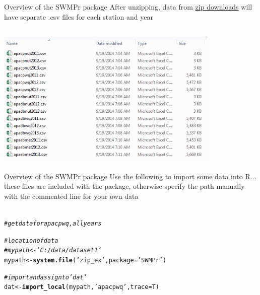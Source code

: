 \documentclass[xcolor=svgnames]{beamer}\usepackage[]{graphicx}\usepackage[]{color}
\makeatletter
\newcommand{\hlstr}[1]{\textcolor[rgb]{0.192,0.494,0.8}{#1}}%
\newcommand{\hlcom}[1]{\textcolor[rgb]{0.678,0.584,0.686}{\textit{#1}}}%
\newcommand{\hlstd}[1]{\textcolor[rgb]{0.345,0.345,0.345}{#1}}%
\newcommand{\hlkwb}[1]{\textcolor[rgb]{0.69,0.353,0.396}{#1}}%
\newcommand{\hlkwc}[1]{\textcolor[rgb]{0.333,0.667,0.333}{#1}}%
\newcommand{\hlkwd}[1]{\textcolor[rgb]{0.737,0.353,0.396}{\textbf{#1}}}%
\newenvironment{kframe}{%
 \def\at@end@of@kframe{}%
 \ifinner\ifhmode%
  \def\at@end@of@kframe{\end{minipage}}%
  \begin{minipage}{\columnwidth}%
 \fi\fi%
 \def\FrameCommand##1{\hskip\@totalleftmargin \hskip-\fboxsep
 \colorbox{shadecolor}{##1}\hskip-\fboxsep
     \hskip-\linewidth \hskip-\@totalleftmargin \hskip\columnwidth}%
 \MakeFramed {\advance\hsize-\width
   \@totalleftmargin\z@ \linewidth\hsize
   \@setminipage}}%
 {\par\unskip\endMakeFramed%
 \at@end@of@kframe}
\newenvironment{knitrout}{}{} %
\makeatother
\begin{document}
\begin{frame}{Overview of the SWMPr package}
After unzipping, data from \href{http://cdmo.baruch.sc.edu/aqs/zips.cfm}{zip downloads} will have separate .csv files for each station and year\\~\\
\centerline{\includegraphics[width = 0.8\textwidth]{zips_ex.png}}
\end{frame}

\begin{frame}[fragile]{Overview of the SWMPr package}
Use the following to import some data into R... these files are included with the package, otherwise specify the path manually with the commented line for your own data\\~\\
\begin{knitrout}\scriptsize
{}\color{fgcolor}\begin{kframe}
\begin{alltt}
\hlcom{# get data for apacpwq, all years}

\hlcom{# location of data}
\hlcom{# mypath <- 'C:/data/dataset1'}
\hlstd{mypath} \hlkwb{<-} \hlkwd{system.file}\hlstd{(}\hlstr{'zip_ex'}\hlstd{,} \hlkwc{package} \hlstd{=} \hlstr{'SWMPr'}\hlstd{)}

\hlcom{# import and assign to 'dat'}
\hlstd{dat} \hlkwb{<-} \hlkwd{import_local}\hlstd{(mypath,} \hlstr{'apacpwq'}\hlstd{,} \hlkwc{trace} \hlstd{= T)}
\end{alltt}
\end{kframe}
\end{knitrout}
\end{frame}
\end{document}
